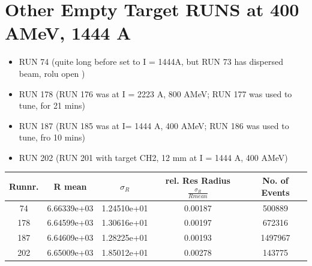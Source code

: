 \documentclass[12pt, letterpaper]{article}
\begin{document}
\section{Other Empty Target RUNS at 400 AMeV, 1444 A}
\begin{itemize}
\item RUN 74 (quite long before set to I = 1444A, but RUN 73 has dispersed beam, rolu open )
\item RUN 178 (RUN 176 was at I = 2223 A, 800 AMeV; RUN 177 was used to tune, for 21 mins)
\item RUN 187 (RUN 185 was at I= 1444 A, 400 AMeV; RUN 186 was used to tune, fro 10 mins)
\item RUN 202 (RUN 201 with target CH2, 12 mm at I = 1444 A, 400 AMeV)
\end{itemize}

\begin{tabular}{|c|c|c|c|c|}
\hline
Runnr. & R mean & $\sigma_{R}$ & rel. Res Radius $\frac{\sigma_{R}}{R mean}$ & No. of Events\\
\hline
74		&	 6.66339e+03	&	1.24510e+01	& 0.00187 &	500889 \\
178		&	6.64599e+03	&	1.30616e+01	& 0.00197 &  672316	 \\
187 		&	6.64609e+03	&	1.28225e+01	& 0.00193 & 1497967	 \\
202		&	 6.65009e+03	&	1.85012e+01	& 0.00278 & 143775 	 \\


\hline

\end{tabular}
\end{document}

